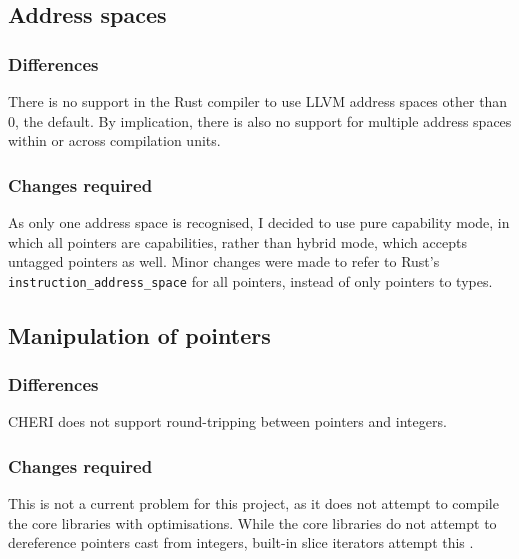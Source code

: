 \documentclass[dissertation.tex]{subfiles}
\begin{document}
\subsection{Address spaces}

\subsubsection{Differences}
There is no support in the Rust compiler to use LLVM address spaces
other than 0, the default.
By implication, there is also no support for multiple address spaces
within or across compilation units.

\subsubsection{Changes required}
As only one address space is recognised, I decided to use pure
capability mode, in which all pointers are capabilities, rather than
hybrid mode, which accepts untagged pointers as well.
Minor changes were made to refer to Rust's
\texttt{instruction\_address\_space} for all pointers, instead of only
pointers to types.


\subsection{Manipulation of pointers}
\label{sec:impl-manipulation}

\subsubsection{Differences}


CHERI does not support round-tripping between pointers and integers.

\subsubsection{Changes required}
This is not a current problem for this project, as it does not attempt
to compile the core libraries with optimisations.
While the core libraries do not attempt to dereference pointers cast
from integers, built-in slice iterators attempt this .
\end{document}
